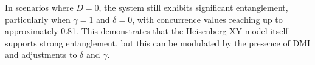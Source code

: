In scenarios where \(D = 0\), the system still exhibits significant entanglement, particularly when 
\(\gamma = 1\) and \(\delta = 0\), with concurrence values reaching up to approximately 0.81. 
This demonstrates that the Heisenberg XY model itself supports strong entanglement, but this can be 
modulated by the presence of DMI and adjustments to \(\delta\) and \(\gamma\).




